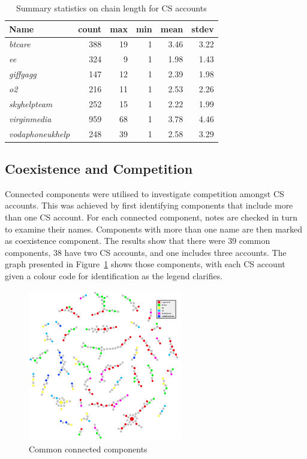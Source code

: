 \documentclass[sigconf]{acmart}
\begin{document}
\begin{table}[!h]
\centering
\begin{tabularx}{\columnwidth}{lrrrrr}
\toprule
\textbf{Name} & \textbf{count} & \textbf{max} & \textbf{min} & \textbf{mean} & \textbf{stdev}\\ 
\midrule
{\emph{btcare}} & 388 & 19 & 1 & 3.46 & 3.22\\
{\emph{ee}} & 324 & 9 & 1 & 1.98 & 1.43\\
{\emph{giffgagg}} & 147 & 12 & 1 & 2.39 & 1.98\\ 
{\emph{o2}} & 216 & 11 & 1 & 2.53 & 2.26\\
{\emph{skyhelpteam}} & 252 & 15 & 1 & 2.22 & 1.99\\
{\emph{virginmedia}} & 959 & 68 & 1 & 3.78 & 4.46\\
{\emph{vodaphoneukhelp}} & 248 & 39 & 1 & 2.58 & 3.29\\
\bottomrule
\end{tabularx}
\caption{Summary statistics on chain length for CS accounts}
\label{tbl:delaystatscl}
\end{table}

\subsection{Coexistence and Competition}

Connected components were utilised to investigate competition amongst 
CS accounts. This was achieved by first identifying components that include 
more than one CS account. For each connected component, notes are 
checked in turn to examine their names. Components with more than one name
are then marked as coexistence component. The results show that there were 
39 common components, 38 have two CS accounts, and one includes three 
accounts. The graph presented in Figure~\ref{fig:commoncc} shows those 
components, with each CS account given a colour code for identification as 
the legend clarifies.

\begin{figure}[htb]
\centering
\includegraphics[width=0.6\textwidth]{images/commoncc.png}
\caption{Common connected components}
\label{fig:commoncc}
\end{figure}
\end{document}
